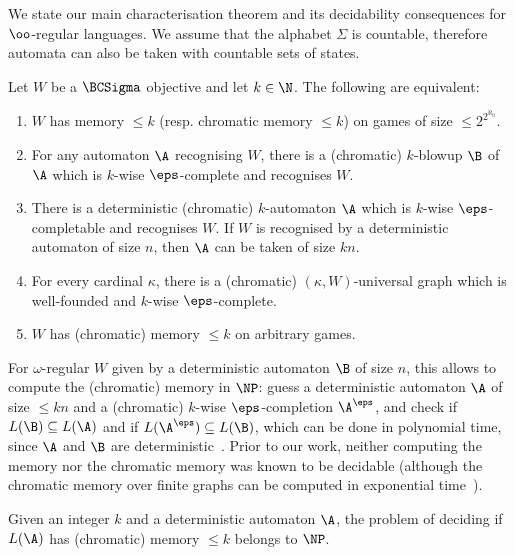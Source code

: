We state our main characterisation theorem and its decidability consequences for $\oo$-regular languages.
We assume that the alphabet $\Sigma$ is countable, therefore automata can also be taken with countable sets of states.


\begin{theorem}\label{thm:main-charac}
Let $W$ be a $\BCSigma$ objective and let $k \in \N$.
The following are equivalent:
\begin{enumerate}[(i.)]
    \item\label{item:memory-small-games} $W$ has memory $\leq k$ (resp. chromatic memory $\leq k$) on games of size $\leq 2^{2^{\aleph_0}}$.
    \item\label{item:existence-automata} For any automaton $\A$ recognising $W$, there is a (chromatic) $k$-blowup $\B$ of $\A$ which is $k$-wise $\eps$-complete and recognises $W$.
    \item\label{item:existence-det-automata} There is a deterministic (chromatic) $k$-automaton $\A$ which is $k$-wise $\eps$-completable and recognises $W$. If $W$ is recognised by a deterministic automaton of size $n$, then $\A$ can be taken of size $kn$.
    \item\label{item:existence-universal-graph} For every cardinal $\kappa$, there is a (chromatic)  $(\kappa,W)$-universal graph which is well-founded and $k$-wise $\eps$-complete.
    \item\label{item:memory-arbitrary-games} $W$ has (chromatic) memory $\leq k$ on arbitrary games.
\end{enumerate}
\end{theorem}

For $\omega$-regular $W$ given by a deterministic automaton $\B$ of size $n$, this allows to compute the (chromatic) memory in $\NP$: guess a deterministic automaton $\A$ of size $\leq kn$ and a (chromatic) $k$-wise $\eps$-completion $\A^\eps$, and check if  $L(\B) \subseteq L(\A)$ and if $L(\A^\eps) \subseteq L(\B)$, which can be done in polynomial time, since $\A$ and $\B$ are deterministic~\cite{ClarkeDK93Unified}.
Prior to our work, neither computing the memory nor the chromatic memory was known to be decidable (although the chromatic memory over finite graphs can be computed in exponential time~\cite{Kop08Thesis}).

\begin{corollary}[Decidability in $\NP$]\label{thm:NP-computation-memory}
    Given an integer $k$ and a deterministic automaton $\A$, the problem of deciding if $L(\A)$ has (chromatic) memory $\leq k$ belongs to $\NP$.
\end{corollary}

